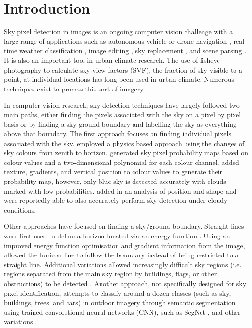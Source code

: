 \documentclass[final,3p,times,authoryear]{elsarticle}
\begin{document}
\section{Introduction}\label{sec:introduction}
Sky pixel detection in images is an ongoing computer vision challenge with a large range of applications such as autonomous vehicle or drone navigation \citep{Shen2013}, real time weather classification \citep{Roser2008}, image editing \citep{Laffont2014,Tao2009}, sky replacement \citep{Tsai2016}, and scene parsing \citep{Tighe2010,Hoiem2005}. It is also an important tool in urban climate research. The use of fisheye photography to calculate sky view factors (SVF), the fraction of sky visible to a point, at individual locations has long been used in urban climate. Numerous techniques exist to process this sort of imagery \citep{Grimmond2001,Chapman2004,Ali-Toudert2007}.

In computer vision research, sky detection techniques have largely followed two main paths, either finding the pixels associated with the sky on a pixel by pixel basis or by finding a sky-ground boundary and labelling the sky as everything above that boundary. The first approach focuses on finding individual pixels associated with the sky. \cite{Luo2002} employed a physics based approach using the changes of sky colours from zenith to horizon. \cite{Gallagher2004} generated sky pixel probability maps based on colour values and a two-dimensional polynomial for each colour channel. \cite{Zafarifar2007} added texture, gradients, and vertical position to colour values to generate their probability map, however, only blue sky is detected accurately with clouds marked with low probabilities. \cite{Schmitt2009} added in an analysis of position and shape and were reportedly able to also accurately perform sky detection under cloudy conditions. 

Other approaches have focused on finding a sky/ground boundary. Straight lines were first used to define a horizon located via an energy function \citep{Ettinger2003}. Using an improved energy function optimisation and gradient information from the image, \cite{Shen2013} allowed the horizon line to follow the boundary instead of being restricted to a straight line. Additional variations allowed increasingly difficult sky regions (i.e. regions separated from the main sky region by buildings, flags, or other obstructions) to be detected \citep{Zhijie2014,Zhijie2015}. Another approach, not specifically designed for sky pixel identification, attempts to classify around a dozen classes (such as sky, buildings, trees, and cars) in outdoor imagery through semantic segmentation using trained convolutional neural networks (CNN), such as SegNet \citep{Badrinarayanan2017}, and other variations \citep{Holder2016,Middel2019}.
\end{document}
